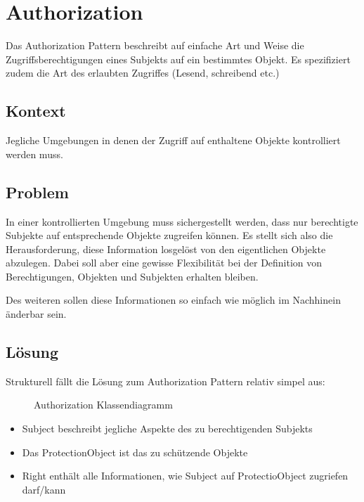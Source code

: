 \section{Authorization}

Das Authorization Pattern beschreibt auf einfache Art und Weise die Zugriffsberechtigungen eines Subjekts auf ein bestimmtes Objekt. Es spezifiziert zudem die Art des erlaubten Zugriffes (Lesend, schreibend etc.)

\subsection*{Kontext}
Jegliche Umgebungen in denen der Zugriff auf enthaltene Objekte kontrolliert werden muss.

\subsection*{Problem}
In einer kontrollierten Umgebung muss sichergestellt werden, dass nur berechtigte Subjekte auf entsprechende Objekte zugreifen können. Es stellt sich also die Herausforderung, diese Information losgelöst von den eigentlichen Objekte abzulegen. Dabei soll aber eine gewisse Flexibilität bei der Definition von Berechtigungen, Objekten und Subjekten erhalten bleiben.

Des weiteren sollen diese Informationen so einfach wie möglich im Nachhinein änderbar sein.

\subsection*{Lösung}
Strukturell fällt die Lösung zum Authorization Pattern relativ simpel aus:

\begin{figure}[H]
	\begin{center}
	\end{center}
\caption{Authorization Klassendiagramm}
\end{figure}

\begin{itemize}
	\item Subject beschreibt jegliche Aspekte des zu berechtigenden Subjekts
	\item Das ProtectionObject ist das zu schützende Objekte
	\item Right enthält alle Informationen, wie Subject auf ProtectioObject zugriefen darf/kann
\end{itemize}

